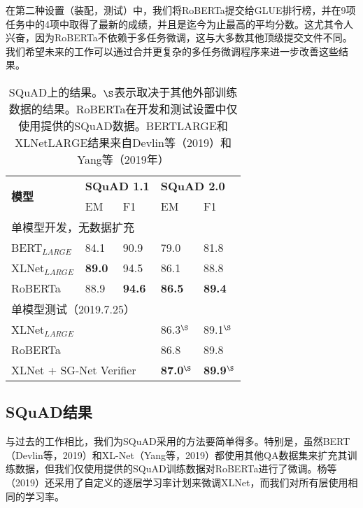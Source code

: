 \documentclass[lang=cn,11pt,a4paper,twocolumn]{elegantpaper}
\begin{document}
在第二种设置（装配，测试）中，我们将RoBERTa提交给GLUE排行榜，并在9项任务中的4项中取得了最新的成绩，并且是迄今为止最高的平均分数。这尤其令人兴奋，因为RoBERTa不依赖于多任务微调，这与大多数其他顶级提交文件不同。我们希望未来的工作可以通过合并更复杂的多任务微调程序来进一步改善这些结果。
\begin{table}[]
  \centering
  \begin{tabular}{p{2cm}llll}
  \hline
  \multirow{2}{*}{\textbf{模型}} & \multicolumn{2}{l}{\textbf{SQuAD 1.1}} & \multicolumn{2}{l}{\textbf{SQuAD 2.0}}  \\
                                  & EM                 & F1                & EM                 & F1                 \\ \hline
  \multicolumn{5}{l}{单模型开发，无数据扩充}                                                                                    \\
  BERT$_{LARGE}$                  & 84.1               & 90.9              & 79.0               & 81.8               \\
  XLNet$_{LARGE}$                 & \textbf{89.0}      & 94.5              & 86.1               & 88.8               \\
  RoBERTa                         & 88.9               & \textbf{94.6}     & \textbf{86.5}      & \textbf{89.4}      \\ \hline
  \multicolumn{5}{l}{单模型测试（2019.7.25）}         \\
  \multicolumn{3}{l}{XLNet$_{LARGE}$}                                      & 86.3$^\S$          & 89.1$^\S$          \\
  \multicolumn{3}{l}{RoBERTa}                                              & 86.8               & 89.8               \\
  \multicolumn{3}{l}{XLNet + SG-Net Verifier}                              & \textbf{87.0$^\S$} & \textbf{89.9$^\S$} \\ \hline
  \end{tabular}
  \caption{SQuAD上的结果。$\S$表示取决于其他外部训练数据的结果。RoBERTa在开发和测试设置中仅使用提供的SQuAD数据。BERTLARGE和XLNetLARGE结果来自Devlin等（2019）和Yang等（2019年）}
  \end{table}
\subsection{SQuAD结果}
与过去的工作相比，我们为SQuAD采用的方法要简单得多。特别是，虽然BERT（Devlin等，2019）和XL-Net（Yang等，2019）都使用其他QA数据集来扩充其训练数据，但我们仅使用提供的SQuAD训练数据对RoBERTa进行了微调。杨等（2019）还采用了自定义的逐层学习率计划来微调XLNet，而我们对所有层使用相同的学习率。
\end{document}
